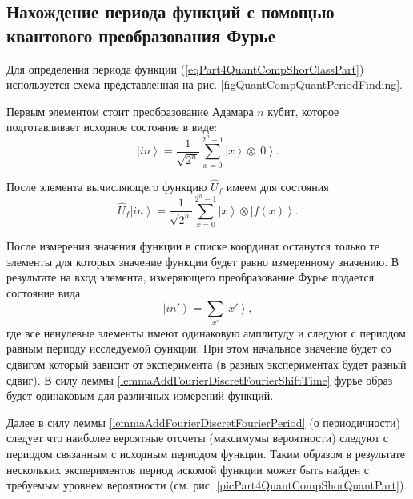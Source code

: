 \subsection{Нахождение периода функций с помощью квантового
  преобразования Фурье}

Для определения периода функции (\ref{eqPart4QuantCompShorClassPart})
используется схема представленная на
рис. \ref{figQuantCompQuantPeriodFinding}.



Первым элементом стоит преобразование Адамара $n$ кубит, которое
подготавливает исходное состояние в виде:
\begin{equation}
\left|in\right> = \frac{1}{\sqrt{2^n}}\sum_{x=0}^{2^n - 1} \left|x\right>
\otimes\left|0\right>.
\nonumber
\end{equation}

После элемента вычисляющего функцию $\hat{U}_f$ имеем для состояния
\begin{equation}
\hat{U}_f\left|in\right> = \frac{1}{\sqrt{2^n}}\sum_{x=0}^{2^n - 1} \left|x\right>
\otimes\left|f\left(x\right)\right>.
\nonumber
\end{equation} 



После измерения значения функции в списке координат останутся только
те элементы для которых значение функции будет равно измеренному
значению. В результате на вход элемента, измеряющего преобразование
Фурье подается состояние вида 
\begin{equation}
\left|in'\right> = \sum_{x'} \left|x'\right>,
\nonumber
\end{equation} 
где все ненулевые элементы имеют одинаковую амплитуду и следуют с
периодом равным периоду исследуемой функции. При этом начальное
значение будет со сдвигом который зависит от эксперимента (в разных
экспериментах будет разный сдвиг). В силу леммы
\ref{lemmaAddFourierDiscretFourierShiftTime} фурье образ будет
одинаковым для различных измерений функций.

Далее в силу леммы \ref{lemmaAddFourierDiscretFourierPeriod}
(о периодичности) следует что наиболее вероятные отсчеты (максимумы
вероятности) следуют с периодом связанным с исходным периодом
функции. Таким образом в результате нескольких экспериментов период
искомой функции может быть найден с требуемым уровнем вероятности
(см. рис. \ref{picPart4QuantCompShorQuantPart}).

